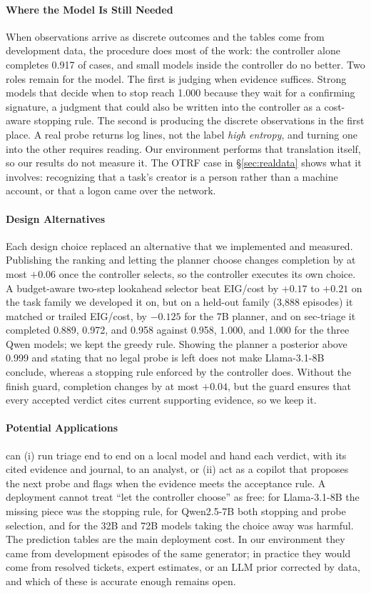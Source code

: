\paragraph{Where the Model Is Still Needed} When observations arrive as discrete outcomes and the tables come from development data, the procedure does most of the work: the controller alone completes 0.917 of cases, and small models inside the controller do no better. Two roles remain for the model. The first is judging when evidence suffices. Strong models that decide when to stop reach 1.000 because they wait for a confirming signature, a judgment that could also be written into the controller as a cost-aware stopping rule. The second is producing the discrete observations in the first place. A real probe returns log lines, not the label \textit{high entropy}, and turning one into the other requires reading. Our environment performs that translation itself, so our results do not measure it. The OTRF case in \S\ref{sec:realdata} shows what it involves: recognizing that a task's creator is a person rather than a machine account, or that a logon came over the network.

\paragraph{Design Alternatives} Each design choice replaced an alternative that we implemented and measured. Publishing the ranking and letting the planner choose changes completion by at most $+0.06$ once the controller selects, so the controller executes its own choice. A budget-aware two-step lookahead selector beat EIG/cost by $+0.17$ to $+0.21$ on the task family we developed it on, but on a held-out family (3{,}888 episodes) it matched or trailed EIG/cost, by $-0.125$ for the 7B planner, and on sec-triage it completed 0.889, 0.972, and 0.958 against 0.958, 1.000, and 1.000 for the three Qwen models; we kept the greedy rule. Showing the planner a posterior above 0.999 and stating that no legal probe is left does not make Llama-3.1-8B conclude, whereas a stopping rule enforced by the controller does. Without the finish guard, completion changes by at most $+0.04$, but the guard ensures that every accepted verdict cites current supporting evidence, so we keep it.

\paragraph{Potential Applications} \hesp{} can (i) run triage end to end on a local model and hand each verdict, with its cited evidence and journal, to an analyst, or (ii) act as a copilot that proposes the next probe and flags when the evidence meets the acceptance rule. A deployment cannot treat ``let the controller choose'' as free: for Llama-3.1-8B the missing piece was the stopping rule, for Qwen2.5-7B both stopping and probe selection, and for the 32B and 72B models taking the choice away was harmful. The prediction tables are the main deployment cost. In our environment they came from development episodes of the same generator; in practice they would come from resolved tickets, expert estimates, or an LLM prior corrected by data, and which of these is accurate enough remains open.

